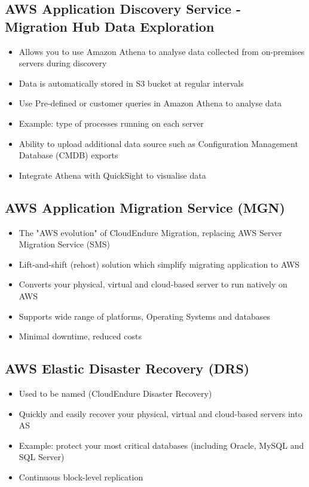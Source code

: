 {{\subsection{AWS Application Discovery Service - Migration Hub Data Exploration}
\begin{itemize}
    \item Allows you to use Amazon Athena to analyse data collected from on-premises servers during discovery
    \item Data is automatically stored in S3 bucket at regular intervals
    \item Use Pre-defined or customer queries in Amazon Athena to analyse data
    \item Example: type of processes running on each server
    \item Ability to upload additional data source such as Configuration Management Database (CMDB) exports
    \item Integrate Athena with QuickSight to visualise data
\end{itemize}

\subsection{AWS Application Migration Service (MGN)}
\begin{itemize}
    \item The "AWS evolution" of CloudEndure Migration, replacing AWS Server Migration Service (SMS)
    \item Lift-and-shift (rehost) solution which simplify migrating application to AWS
    \item Converts your physical, virtual and cloud-based server to run natively on AWS
    \item Supports wide range of platforms, Operating Systems and databases
    \item Minimal downtime, reduced costs
\end{itemize}

\subsection{AWS Elastic Disaster Recovery (DRS)}
\begin{itemize}
    \item Used to be named (CloudEndure Disaster Recovery)
    \item Quickly and easily recover your physical, virtual and cloud-based servers into AS
    \item Example: protect your most critical databases (including Oracle, MySQL and SQL Server)
    \item Continuous block-level replication
\end{itemize}

}}
